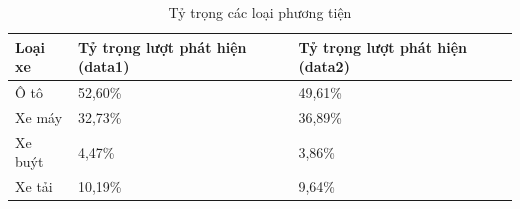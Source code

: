 \begin{table}[htbp]
        \centering
        \caption{Tỷ trọng các loại phương tiện}
        \label{tab:ty_trong_phuong_tien}
        \vspace{0.2cm}
        \begin{tabular}{|p{3cm}|p{6cm}|p{6cm}|}
            \hline
            \textbf{Loại xe} & \textbf{Tỷ trọng lượt phát hiện (data1)} & \textbf{Tỷ trọng lượt phát hiện (data2)} \\
            \hline
            Ô tô & 52,60\% & 49,61\% \\
            \hline
            Xe máy & 32,73\% & 36,89\% \\
            \hline
            Xe buýt & 4,47\% & 3,86\% \\
            \hline
            Xe tải & 10,19\% & 9,64\% \\
            \hline
        \end{tabular}
    \end{table}